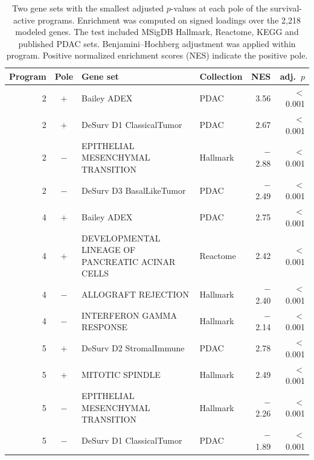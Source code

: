 \begin{table}[tbp]
\centering
\small
\caption{Two gene sets with the smallest adjusted $p$-values at each pole of the survival-active programs. Enrichment was computed on signed loadings over the 2,218 modeled genes. The test included MSigDB Hallmark, Reactome, KEGG and published PDAC sets. Benjamini--Hochberg adjustment was applied within program. Positive normalized enrichment scores (NES) indicate the positive pole.}
\label{tab:enrichment}
\begin{tabular}{@{}r c p{2.6in} l r r@{}}
\toprule
Program & Pole & Gene set & Collection & NES & adj.\ $p$ \\
\midrule
2 & $+$ & Bailey ADEX & PDAC & 3.56 & $<$0.001 \\
2 & $+$ & DeSurv D1 ClassicalTumor & PDAC & 2.67 & $<$0.001 \\
2 & $-$ & EPITHELIAL MESENCHYMAL TRANSITION & Hallmark & $-$2.88 & $<$0.001 \\
2 & $-$ & DeSurv D3 BasalLikeTumor & PDAC & $-$2.49 & $<$0.001 \\
4 & $+$ & Bailey ADEX & PDAC & 2.75 & $<$0.001 \\
4 & $+$ & DEVELOPMENTAL LINEAGE OF PANCREATIC ACINAR CELLS & Reactome & 2.42 & $<$0.001 \\
4 & $-$ & ALLOGRAFT REJECTION & Hallmark & $-$2.40 & $<$0.001 \\
4 & $-$ & INTERFERON GAMMA RESPONSE & Hallmark & $-$2.14 & $<$0.001 \\
5 & $+$ & DeSurv D2 StromalImmune & PDAC & 2.78 & $<$0.001 \\
5 & $+$ & MITOTIC SPINDLE & Hallmark & 2.49 & $<$0.001 \\
5 & $-$ & EPITHELIAL MESENCHYMAL TRANSITION & Hallmark & $-$2.26 & $<$0.001 \\
5 & $-$ & DeSurv D1 ClassicalTumor & PDAC & $-$1.89 & $<$0.001 \\
\bottomrule
\end{tabular}
\end{table}
